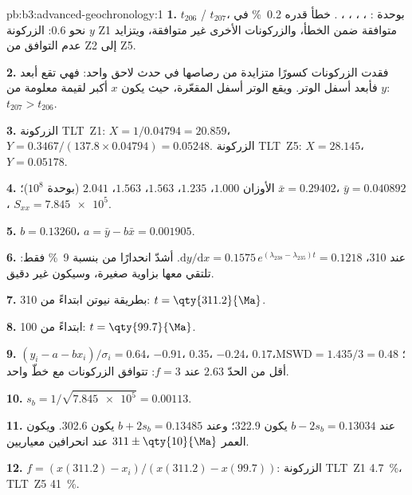 \begin{solution}{pb:b3:advanced-geochronology:1}
\textbf{1.} $t_{206}$ / $t_{207}$، بوحدة \unit{\Ma}: ، ،
، ، . خطأ قدره
\qty{0.2}{\percent} في $y$ نحو \qty{0.6}{\Ma}: الزركونة Z1 متوافقة ضمن
الخطأ، والزركونات الأخرى غير متوافقة، ويتزايد عدم التوافق من Z2 إلى Z5.

\textbf{2.} فقدت الزركونات كسورًا متزايدة من رصاصها في حدث
لاحق واحد: فهي تقع أبعد فأبعد أسفل الوتر. ويقع الوتر أسفل
 المقعّرة، حيث يكون $x$ أكبر لقيمة معلومة من $y$: $t_{207} > t_{206}$.

\textbf{3.} الزركونة \mbox{\textdir TLT Z1}: $X = 1/0.04794 = 20.859$، $Y = 0.3467/(137.8\times0.04794) =
0.05248$. الزركونة \mbox{\textdir TLT Z5}: $X = 28.145$، $Y = 0.05178$.

\textbf{4.} الأوزان $1.000$، $1.235$، $1.563$، $1.563$، $2.041$ (بوحدة
$10^8$)؛ $\bar x = 0.29402$، $\bar y = 0.040892$، $S_{xx} = \num{7.845e5}$.

\textbf{5.} $b = 0.13260$، $a = \bar y - b\bar x = 0.001905$.

\textbf{6.} عند \qty{310}{\Ma}، $\mathrm dy/\mathrm dx = 0.1575\,
e^{(\lambda_{238} - \lambda_{235})t} = 0.1218$.  أشدّ انحدارًا من 
بنسبة \qty{9}{\percent} فقط: تلتقي معها بزاوية صغيرة،
وسيكون  غير دقيق.

\textbf{7.} بطريقة نيوتن ابتداءً من \qty{310}{\Ma}: $t = \qty{311.2}{\Ma}$.

\textbf{8.} ابتداءً من \qty{100}{\Ma}: $t = \qty{99.7}{\Ma}$.

\textbf{9.} $(y_i - a - bx_i)/\sigma_i = 0.64$، $-0.91$، $0.35$، $-0.24$،
$0.17$؛ $\mathrm{MSWD} = 1.435/3 = 0.48$، أقل من الحدّ $2.63$ عند $f = 3$:
تتوافق الزركونات مع خطّ واحد.

\textbf{10.} $s_b = 1/\sqrt{\num{7.845e5}} = 0.00113$.

\textbf{11.} عند $b - 2s_b = 0.13034$ يكون 
\qty{322.9}{\Ma}؛ وعند $b + 2s_b = 0.13485$ يكون \qty{302.6}{\Ma}. ويكون العمر
$311 \pm \qty{10}{\Ma}$ عند انحرافين معياريين.

\textbf{12.} $f = (x(311.2) - x_i)/(x(311.2) - x(99.7))$: الزركونة \mbox{\textdir TLT Z1} \qty{4.7}{\percent}،
\mbox{\textdir TLT Z5} \qty{41}{\percent}.


\end{solution}

